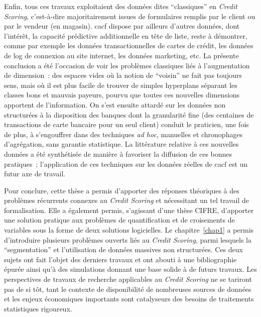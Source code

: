 \medskip

Enfin, tous ces travaux exploitaient des données dites ``classiques'' en \textit{Credit Scoring}, c'est-à-dire majoritairement issues de formulaires remplis par le client ou par le vendeur (en magasin). \gls{cacf} dispose par ailleurs d'autres données, dont l'intérêt, la capacité prédictive additionnelle en tête de liste, reste à démontrer, comme par exemple les données transactionnelles de cartes de crédit, les données de log de connexion au site internet, les données marketing, etc. La présente conclusion a été l'occasion de voir les problèmes classiques liés à l'augmentation de dimension~: des espaces vides où la notion de ``voisin'' ne fait pas toujours sens, mais où il est plus facile de trouver de simples hyperplans séparant les classes bons et mauvais payeurs, pourvu que toutes ces nouvelles dimensions apportent de l'information. On s'est ensuite attardé sur les données non structurées à la disposition des banques dont la granularité fine (des centaines de transactions de carte bancaire pour un seul client) conduit le praticien, une fois de plus, à s'engouffrer dans des techniques \textit{ad hoc}, manuelles et chronophages d'agrégation, sans garantie statistique. La littérature relative à ces nouvelles données a été synthétisée de manière à favoriser la diffusion de ces bonnes pratiques~; l'application de ces techniques sur les données réelles de \gls{cacf} est un futur axe de travail.

\medskip

Pour conclure, cette thèse a permis d'apporter des réponses théoriques à des problèmes récurrents connexes au \textit{Credit Scoring} et nécessitant un tel travail de formalisation. Elle a également permis, s'agissant d'une thèse CIFRE, d'apporter une solution pratique aux problèmes de quantification et de croisements de variables sous la forme de deux solutions logicielles. Le chapitre~\ref{chap1} a permis d'introduire plusieurs problèmes ouverts liés au \textit{Credit Scoring}, parmi lesquels la ``segmentation'' et l'utilisation de données massives non structurées. Ces deux sujets ont fait l'objet des derniers travaux et ont abouti à une bibliographie épurée ainsi qu'à des simulations donnant une base solide à de futurs travaux. Les perspectives de travaux de recherche applicables au \textit{Credit Scoring} ne se tariront pas de si tôt, tant le contexte de disponibilité de nombreuses sources de données et les enjeux économiques importants sont catalyseurs des besoins de traitements statistiques rigoureux.

\printbibliography[heading=subbibliography, title=Références de la conclusion]